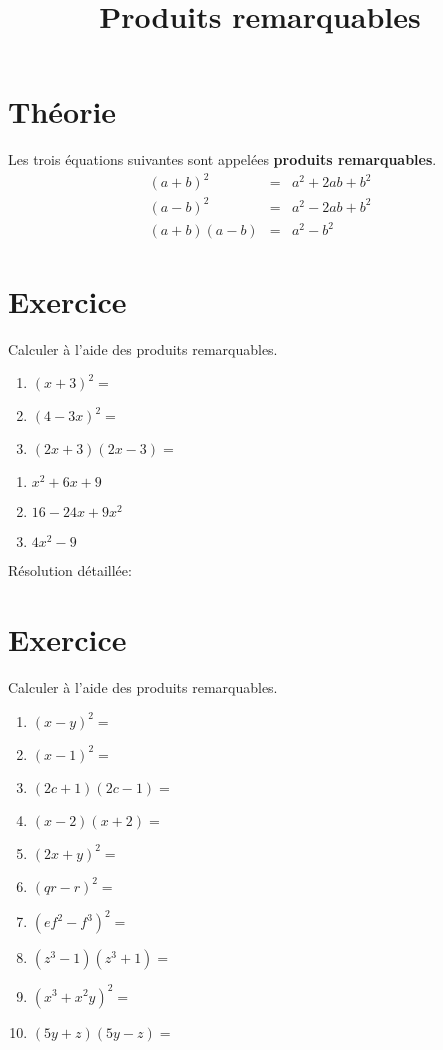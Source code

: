 \documentclass[a4paper,11pt]{article}
\begin{document}
\title{Produits remarquables}
\date{}
\maketitle

\section{Théorie}
Les trois équations suivantes sont appelées \textbf{produits remarquables}.
$$\begin{array}{rcl}
(a+b)^2 &=& a^2+2ab+b^2 \\
(a-b)^2 &=& a^2-2ab+b^2 \\
(a+b)(a-b) &=& a^2-b^2
\end{array}$$

\section{Exercice}
Calculer à l'aide des produits remarquables.
\begin{enumerate}
\item $(x+3)^2=$
\item $(4-3x)^2=$
\item $(2x+3)(2x-3)=$
\end{enumerate}

\begin{solution}
\begin{enumerate}
\item $x^2+6x+9$
\item $16-24x+9x^2$
\item $4x^2-9$
\end{enumerate}

Résolution détaillée:\\
\end{solution}

\section{Exercice}
Calculer à l'aide des produits remarquables.
\begin{multicols}{2}
\begin{enumerate}
\item $(x-y)^2=$
\item $(x-1)^2=$
\item $(2c+1)(2c-1)=$
\item $(x-2)(x+2)=$
\item $(2x+y)^2=$
\item $(qr-r)^2=$
\item $(ef^2-f^3)^2=$
\item $(z^3-1)(z^3+1)=$
\item $(x^3+x^2y)^2=$
\item $(5y+z)(5y-z)=$
\end{enumerate}
\end{multicols}
\end{document}
